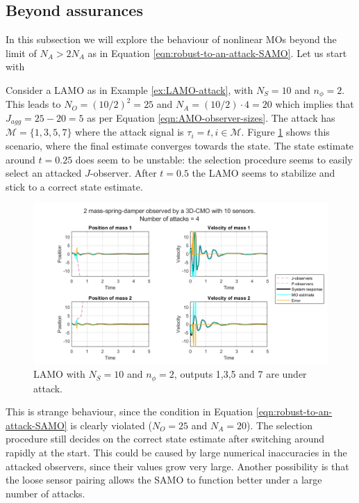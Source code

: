 \subsection{Beyond assurances}
In this subsection we will explore the behaviour of nonlinear MOs beyond the limit of $N_A > 2N_A$ as in Equation \eqref{eqn:robust-to-an-attack-SAMO}. Let us start with 
\begin{example}\label{ex:LAMO-unrobust-attack}
    Consider a LAMO as in Example \ref{ex:LAMO-attack}, with $N_S=10$ and $n_{\phi}=2$. This leads to $N_O=(10/2)^2=25$ and $N_A = (10/2)\cdot 4=20$ which implies that $J_{agg}=25-20=5$ as per Equation \eqref{eqn:AMO-observer-sizes}. The attack has $\mathcal{M}=\{1,3,5,7\}$ where the attack signal is $\tau_i=t,i\in\mathcal{M}$. 
    Figure \ref{fig:LAMO-attack} shows this scenario, where the final estimate converges towards the state. The state estimate around $t=0.25$ does seem to be unstable: the selection procedure seems to easily select an attacked $J$-observer. After $t=0.5$ the LAMO seems to stabilize and stick to a correct state estimate.
    \begin{figure}[H]
        \centering
        \includegraphics[width=\linewidth]{report/Figures/LAMO-attack.png}
        \caption{LAMO with $N_S=10$ and $n_{\phi}=2$, outputs 1,3,5 and 7 are under attack.}
        \label{fig:LAMO-attack}
    \end{figure}
\end{example}
This is strange behaviour, since the condition in Equation \eqref{eqn:robust-to-an-attack-SAMO} is clearly violated ($N_O=25$ and $N_A=20$). The selection procedure still decides on the correct state estimate after switching around rapidly at the start. This could be caused by large numerical inaccuracies in the attacked observers, since their values grow very large. Another possibility is that the loose sensor pairing allows the SAMO to function better under a large number of attacks.